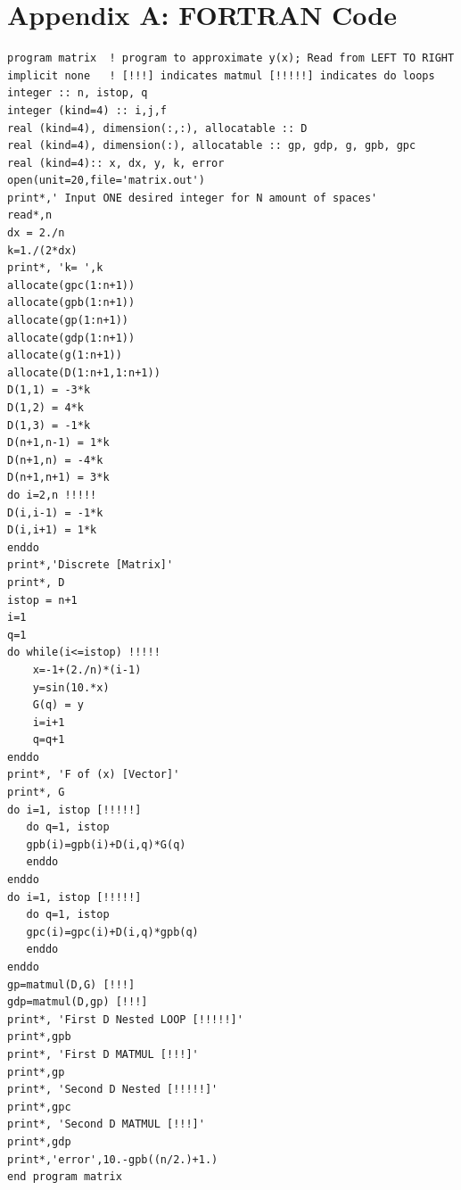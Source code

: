 \documentclass[12pt]{article}
\begin{document}
\newpage
\section*{Appendix A: FORTRAN Code}
\begingroup
\fontsize{8pt}{10pt}\selectfont
\begin{verbatim}
program matrix  ! program to approximate y(x); Read from LEFT TO RIGHT
implicit none   ! [!!!] indicates matmul [!!!!!] indicates do loops
integer :: n, istop, q
integer (kind=4) :: i,j,f
real (kind=4), dimension(:,:), allocatable :: D
real (kind=4), dimension(:), allocatable :: gp, gdp, g, gpb, gpc
real (kind=4):: x, dx, y, k, error
open(unit=20,file='matrix.out')
print*,' Input ONE desired integer for N amount of spaces'  
read*,n
dx = 2./n
k=1./(2*dx)
print*, 'k= ',k            
allocate(gpc(1:n+1))         
allocate(gpb(1:n+1))                 
allocate(gp(1:n+1))         
allocate(gdp(1:n+1))        
allocate(g(1:n+1))           
allocate(D(1:n+1,1:n+1))     
D(1,1) = -3*k 
D(1,2) = 4*k  
D(1,3) = -1*k
D(n+1,n-1) = 1*k
D(n+1,n) = -4*k
D(n+1,n+1) = 3*k
do i=2,n !!!!!
D(i,i-1) = -1*k
D(i,i+1) = 1*k
enddo
print*,'Discrete [Matrix]'
print*, D
istop = n+1
i=1
q=1
do while(i<=istop) !!!!!
	x=-1+(2./n)*(i-1)
	y=sin(10.*x)
	G(q) = y
	i=i+1
	q=q+1
enddo
print*, 'F of (x) [Vector]'
print*, G
do i=1, istop [!!!!!]
   do q=1, istop
   gpb(i)=gpb(i)+D(i,q)*G(q)
   enddo
enddo
do i=1, istop [!!!!!]
   do q=1, istop
   gpc(i)=gpc(i)+D(i,q)*gpb(q)
   enddo
enddo
gp=matmul(D,G) [!!!]
gdp=matmul(D,gp) [!!!]
print*, 'First D Nested LOOP [!!!!!]'
print*,gpb
print*, 'First D MATMUL [!!!]'
print*,gp
print*, 'Second D Nested [!!!!!]'
print*,gpc
print*, 'Second D MATMUL [!!!]'
print*,gdp
print*,'error',10.-gpb((n/2.)+1.)
end program matrix             
\end{verbatim}
\endgroup
\end{document}
